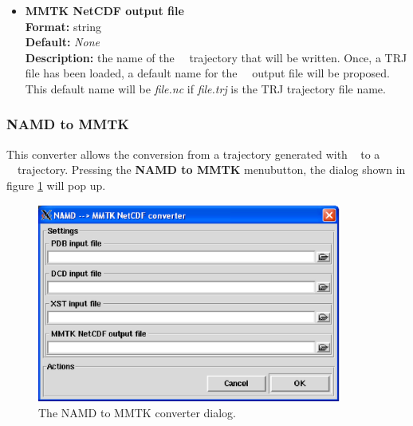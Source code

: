 \documentclass[a4paper,11pt]{report}
\begin{document}
\begin{itemize}
\item \textbf{MMTK NetCDF output file}\\
\textbf{Format:} string\\
\textbf{Default:} \textit{None}\\
\textbf{Description:} the name of the \MMTK\ \NetCDF\ trajectory that will be written. Once, a TRJ file has been 
loaded, a default name for the \MMTK\ \NetCDF\ output file will be proposed. This default name will be 
\textit{file.nc} if \textit{file.trj} is the TRJ trajectory file name.
\end{itemize}

\subsubsection{NAMD to MMTK}
\label{namd_to_mmtk}
This converter allows the conversion from a trajectory generated with \NAMD\ \cite{NAMD} to a \MMTK\ \NetCDF\ trajectory. 
Pressing the \textbf{NAMD to MMTK} menubutton, the dialog shown in figure \ref{fig:namd_converter} will pop up.
\newpage
\begin{figure}[h!]
\begin{center}
\includegraphics[width=10cm]{Figures/namd_converter.eps}
\end{center}
\caption[The NAMD to MMTK converter dialog]{The NAMD to MMTK converter dialog.}
\label{fig:namd_converter}
\end{figure}   
\end{document}
